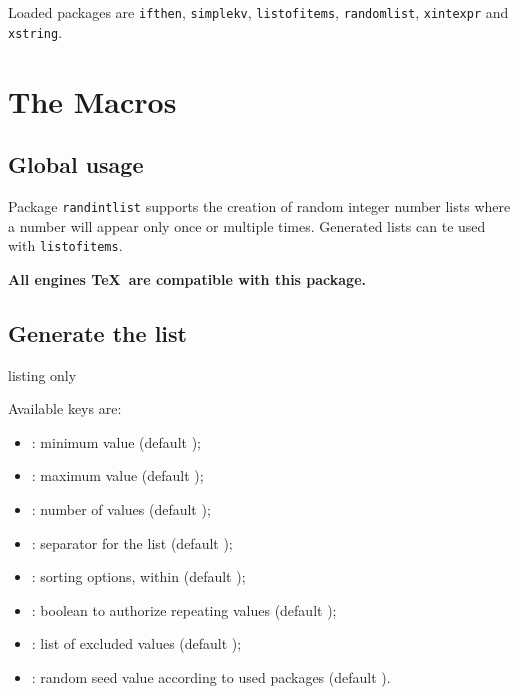 \documentclass[11pt,a4paper]{ltxdoc}
\begin{document}
Loaded packages are \texttt{ifthen}, \texttt{simplekv}, \texttt{listofitems}, \texttt{randomlist},  \texttt{xintexpr} and \texttt{xstring}.

\section{The Macros}

\subsection{Global usage}

Package \texttt{randintlist} supports the creation of random integer number lists where a number will appear only once or multiple times. Generated lists can te used with \texttt{listofitems}.

\hfill\textbf{All engines \TeX\ are compatible with this package.}\hfill~

\subsection{Generate the list}

\begin{DemoCode}{listing only}
\randintlist[keys]{\macro}
\end{DemoCode}

Available keys are:

\begin{itemize}
	\item {}: minimum value (default );
	\item {}: maximum value (default );
	\item {}: number of values (default );
	\item {}: separator for the list (default \ShowCode{,});
	\item {}: sorting options, within  (default );
	\item {}: boolean to authorize repeating values (default );
	\item {}: list of excluded values (default );
	\item {}: random seed value according to used packages (default \ShowCode{-}).
\end{itemize}

\begin{DemoCode}{}
\randintlist{\mylistA}\mylistA
\end{DemoCode}
\end{document}
